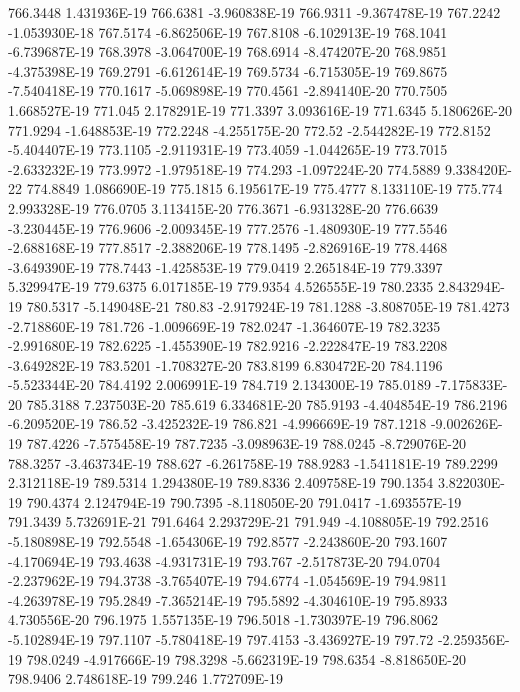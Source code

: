 766.3448  1.431936E-19
766.6381  -3.960838E-19
766.9311  -9.367478E-19
767.2242  -1.053930E-18
767.5174  -6.862506E-19
767.8108  -6.102913E-19
768.1041  -6.739687E-19
768.3978  -3.064700E-19
768.6914  -8.474207E-20
768.9851  -4.375398E-19
769.2791  -6.612614E-19
769.5734  -6.715305E-19
769.8675  -7.540418E-19
770.1617  -5.069898E-19
770.4561  -2.894140E-20
770.7505  1.668527E-19
771.045  2.178291E-19
771.3397  3.093616E-19
771.6345  5.180626E-20
771.9294  -1.648853E-19
772.2248  -4.255175E-20
772.52  -2.544282E-19
772.8152  -5.404407E-19
773.1105  -2.911931E-19
773.4059  -1.044265E-19
773.7015  -2.633232E-19
773.9972  -1.979518E-19
774.293  -1.097224E-20
774.5889  9.338420E-22
774.8849  1.086690E-19
775.1815  6.195617E-19
775.4777  8.133110E-19
775.774  2.993328E-19
776.0705  3.113415E-20
776.3671  -6.931328E-20
776.6639  -3.230445E-19
776.9606  -2.009345E-19
777.2576  -1.480930E-19
777.5546  -2.688168E-19
777.8517  -2.388206E-19
778.1495  -2.826916E-19
778.4468  -3.649390E-19
778.7443  -1.425853E-19
779.0419  2.265184E-19
779.3397  5.329947E-19
779.6375  6.017185E-19
779.9354  4.526555E-19
780.2335  2.843294E-19
780.5317  -5.149048E-21
780.83  -2.917924E-19
781.1288  -3.808705E-19
781.4273  -2.718860E-19
781.726  -1.009669E-19
782.0247  -1.364607E-19
782.3235  -2.991680E-19
782.6225  -1.455390E-19
782.9216  -2.222847E-19
783.2208  -3.649282E-19
783.5201  -1.708327E-20
783.8199  6.830472E-20
784.1196  -5.523344E-20
784.4192  2.006991E-19
784.719  2.134300E-19
785.0189  -7.175833E-20
785.3188  7.237503E-20
785.619  6.334681E-20
785.9193  -4.404854E-19
786.2196  -6.209520E-19
786.52  -3.425232E-19
786.821  -4.996669E-19
787.1218  -9.002626E-19
787.4226  -7.575458E-19
787.7235  -3.098963E-19
788.0245  -8.729076E-20
788.3257  -3.463734E-19
788.627  -6.261758E-19
788.9283  -1.541181E-19
789.2299  2.312118E-19
789.5314  1.294380E-19
789.8336  2.409758E-19
790.1354  3.822030E-19
790.4374  2.124794E-19
790.7395  -8.118050E-20
791.0417  -1.693557E-19
791.3439  5.732691E-21
791.6464  2.293729E-21
791.949  -4.108805E-19
792.2516  -5.180898E-19
792.5548  -1.654306E-19
792.8577  -2.243860E-20
793.1607  -4.170694E-19
793.4638  -4.931731E-19
793.767  -2.517873E-20
794.0704  -2.237962E-19
794.3738  -3.765407E-19
794.6774  -1.054569E-19
794.9811  -4.263978E-19
795.2849  -7.365214E-19
795.5892  -4.304610E-19
795.8933  4.730556E-20
796.1975  1.557135E-19
796.5018  -1.730397E-19
796.8062  -5.102894E-19
797.1107  -5.780418E-19
797.4153  -3.436927E-19
797.72  -2.259356E-19
798.0249  -4.917666E-19
798.3298  -5.662319E-19
798.6354  -8.818650E-20
798.9406  2.748618E-19
799.246  1.772709E-19
